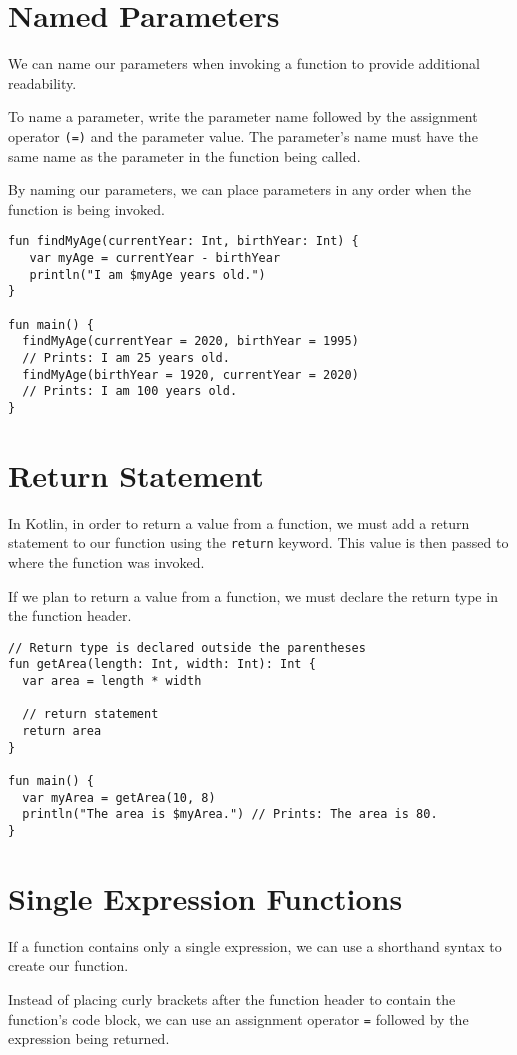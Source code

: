 \section{Named Parameters}
We can name our parameters when invoking a function to provide additional readability.

To name a parameter, write the parameter name followed by the assignment operator \verb!(=)!
and the parameter value. The parameter’s name must have the same name as the parameter in the function being called.

By naming our parameters, we can place parameters in any order when the function is being invoked.

\begin{verbatim}
fun findMyAge(currentYear: Int, birthYear: Int) {
   var myAge = currentYear - birthYear
   println("I am $myAge years old.")
}
 
fun main() {
  findMyAge(currentYear = 2020, birthYear = 1995)
  // Prints: I am 25 years old.
  findMyAge(birthYear = 1920, currentYear = 2020)
  // Prints: I am 100 years old.
}
\end{verbatim}
\newpage
\section{Return Statement}
In Kotlin, in order to return a value from a function, we must add a return statement to our function 
using the \verb!return! keyword. This value is then passed to where the function was invoked.

If we plan to return a value from a function, we must declare the return type in the function header.

\begin{verbatim}
// Return type is declared outside the parentheses
fun getArea(length: Int, width: Int): Int {
  var area = length * width
 
  // return statement
  return area
}
 
fun main() {
  var myArea = getArea(10, 8)
  println("The area is $myArea.") // Prints: The area is 80.
}
\end{verbatim}

\section{Single Expression Functions}
If a function contains only a single expression, we can use a shorthand syntax to create our function.

Instead of placing curly brackets after the function header to contain the function’s code block, 
we can use an assignment operator \verb!=! followed by the expression being returned.

